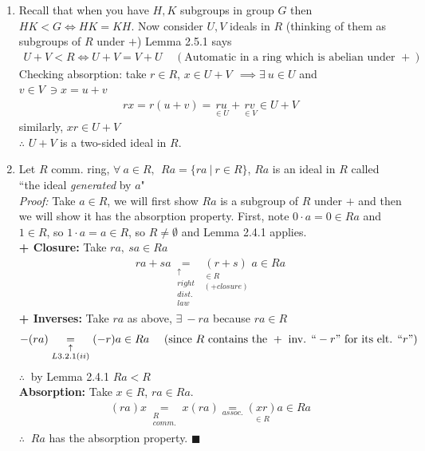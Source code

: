 \begin{enumerate}
    \item Recall that when you have $H,K$ subgroups in group $G$ then $HK<G \iff HK=KH$. Now consider $U,V$ ideals in $R$ (thinking of them as subgroups of $R$ under $+$) Lemma 2.5.1 says
    \begin{align}
        U+V<R \iff U+V=V+U \ \ \ \ \ (\text{Automatic in a ring which is abelian under }+) \nonumber
    \end{align}
    Checking absorption: take $r\in R$, $x\in U+V \ \ \implies \exists \ u\in U $ and $v\in V \ \ni x=u+v$
    \begin{align}
        rx=r(u+v)=\underset{\in U}{ru} + \underset{\in V}{rv} \in U+V \nonumber
    \end{align}
    similarly, $xr \in U+V$\\
    $\therefore$ $U+V$ is a two-sided ideal in $R$.
    \item Let $R$ comm. ring, $\forall \ a\in R, \ \ Ra=\{ra \ | \ r\in R\}$, $Ra$ is an ideal in $R$ called ``the ideal \textit{generated} by $a$"\\
    \textit{Proof:} Take $a\in R$, we will first show $Ra$ is a subgroup of $R$ under $+$ and then we will show it has the absorption property. First, note $0\cdot a=0\in Ra$ and $1\in R$, so $1\cdot a=a\in R$, so $R\neq \emptyset$ and Lemma 2.4.1 applies.\\
    \textbf{+ Closure:} Take $ra, \ sa \in Ra$
    \begin{align}
        ra+sa\underset{\substack{\uparrow \\ right \\dist. \\law}}{=}\underset{\substack{\in R \\ (+ closure)}}{(r+s)}a \in Ra \nonumber
    \end{align}
    \textbf{+ Inverses:} Take $ra$ as above, $\exists \ -ra$ because $ra\in R$
    \begin{align}
        -(ra)\underset{\substack{\uparrow \\ L3.2.1 (ii)}}{=} (-r)a\in Ra \ \ \ \ (\text{since }R \text{ contains the }+\text{ inv. ``}-r"\text{ for its elt. ``} r") \nonumber
    \end{align}
    $\therefore \ $ by Lemma 2.4.1 $Ra<R$ \\ \steezybreak
    \textbf{Absorption:} Take $x\in R$, $ra\in Ra$.
    \begin{align}
        (ra)x \underset{\substack{R \\ comm.}}{=} x(ra) \underset{assoc.}{=} \underset{\in R}{(xr)}a \in Ra \nonumber
    \end{align}
    $\therefore \ $ $Ra$ has the absorption property.  $\blacksquare$
\end{enumerate}\steezybreak
